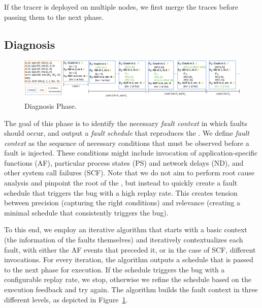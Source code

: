 If the tracer is deployed on multiple nodes, we first merge the traces before passing them to the next phase.


\subsection{Diagnosis}

\begin{figure}[htbp]
	\centering
	\includegraphics[height=0.135\textheight]{Figures/ROSE-Levels.png}
	\caption{Diagnosis Phase.}
	\label{fig:levels}
\end{figure}


\label{sec:diagnosis}
The goal of this phase is to identify the necessary \emph{fault context} in which faults should occur, and output a \emph{fault schedule} that reproduces the \efibsingle .
We define \emph{fault context} as the sequence of necessary conditions that must be observed before a fault is injected.
These conditions might include invocation of application-specific functions (AF), particular process states (PS) and network delays (ND), and other system call failures (SCF).
Note that we do not aim to perform root cause analysis and pinpoint the root of the \efibsingle, but instead to quickly create a fault schedule that triggers the bug with a high replay rate.
This creates tension between precision (capturing the right conditions) and relevance (creating a minimal schedule that consistently triggers the bug).

To this end, we employ an iterative algorithm that starts with a basic context (the information of the faults themselves) and iteratively contextualizes each fault, with either the AF events that preceded it, or in the case of SCF, different invocations.
For every iteration, the algorithm outputs a schedule that is passed to the next phase for execution.
If the schedule triggers the bug with a configurable replay rate, we stop, otherwise we refine the schedule based on the execution feedback and try again.
The algorithm builds the fault context in three different levels, as depicted in Figure~\ref{fig:levels}.



